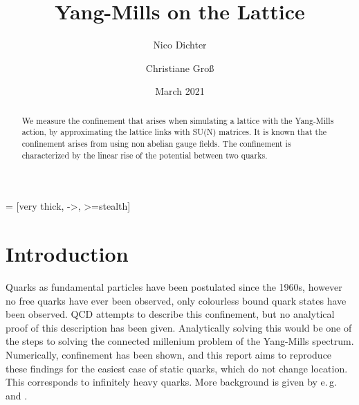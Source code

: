 \documentclass[%
 reprint,
 amsmath,amssymb,
 aps,
]{revtex4-1}
\begin{document}
	 = [very thick, ->, >=stealth]

\title{Yang-Mills on the Lattice}%

\author{Nico Dichter}
\author{Christiane Gro\ss{}}


\date{March 2021}%

\begin{abstract}
	We measure the confinement that arises when simulating a lattice with the Yang-Mills action, by approximating the lattice links with SU(N) matrices. It is known that the confinement arises from using non abelian gauge fields. The confinement is characterized by the linear rise of the potential between two quarks.
\end{abstract}
\maketitle


\section{Introduction}

Quarks as fundamental particles have been postulated since the 1960s, however no free quarks have ever been observed, only colourless bound quark states have been observed. QCD attempts to describe this confinement, but no analytical proof of this description has been given. Analytically solving this would be one of the steps to solving the connected millenium problem of the Yang-Mills spectrum. Numerically, confinement has been shown, and this report aims to reproduce these findings for the easiest case of static quarks, which do not change location.
This corresponds to infinitely heavy quarks. More background is given by e.\,g.\, \citet{lepagelqcd} and \citet{povhparticles}.
\end{document}

